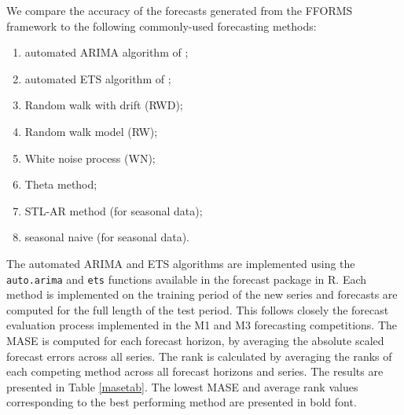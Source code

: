 \documentclass[11pt,a4paper,]{article}
\providecommand{\tightlist}{%
  \setlength{\itemsep}{0pt}\setlength{\parskip}{0pt}}
\begin{document}
We compare the accuracy of the forecasts generated from the FFORMS
framework to the following commonly-used forecasting methods:

\begin{enumerate}
\def\labelenumi{\arabic{enumi}.}
\tightlist
\item
  automated ARIMA algorithm of \textcite{Hyndman2008};
\item
  automated ETS algorithm of \textcite{Hyndman2008};
\item
  Random walk with drift (RWD);
\item
  Random walk model (RW);
\item
  White noise process (WN);
\item
  Theta method;
\item
  STL-AR method (for seasonal data);
\item
  seasonal naive (for seasonal data).
\end{enumerate}

The automated ARIMA and ETS algorithms are implemented using the
\texttt{auto.arima} and \texttt{ets} functions available in the forecast
package in R. Each method is implemented on the training period of the
new series and forecasts are computed for the full length of the test
period. This follows closely the forecast evaluation process implemented
in the M1 and M3 forecasting competitions. The MASE is computed for each
forecast horizon, by averaging the absolute scaled forecast errors
across all series. The rank is calculated by averaging the ranks of each
competing method across all forecast horizons and series. The results
are presented in Table \ref{masetab}. The lowest MASE and average rank
values corresponding to the best performing method are presented in bold
font.
\end{document}
